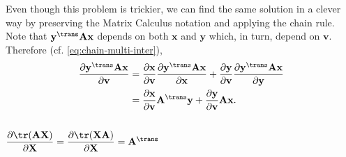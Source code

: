 Even though this problem is trickier, we can find the same solution in a clever way by preserving the Matrix Calculus notation and applying the chain rule. Note that \(\mathbf{y}^\trans \mathbf{A} \mathbf{x}\) depends on both \(\mathbf{x}\) and \(\mathbf{y}\) which, in turn, depend on \(\mathbf{v}\). Therefore (cf. \eqref{eq:chain-multi-inter}),
\begin{align}
    \dfrac{\partial \mathbf{y}^\trans \mathbf{A} \mathbf{x}}{\partial \mathbf{v}} & = \dfrac{\partial \mathbf{x}}{\partial \mathbf{v}} \dfrac{\partial \mathbf{y}^\trans \mathbf{A} \mathbf{x}}{\partial \mathbf{x}} + \dfrac{\partial \mathbf{y}}{\partial \mathbf{v}} \dfrac{\partial \mathbf{y}^\trans \mathbf{A} \mathbf{x}}{\partial \mathbf{y}} \\
    & = \dfrac{\partial \mathbf{x}}{\partial \mathbf{v}} \mathbf{A}^{\trans} \mathbf{y} + \dfrac{\partial \mathbf{y}}{\partial \mathbf{v}} \mathbf{A} \mathbf{x}.
\end{align}

\subsection{\(\dfrac{\partial \tr(\mathbf{A} \mathbf{X})}{\partial \mathbf{X}} = \dfrac{\partial \tr(\mathbf{X} \mathbf{A})}{\partial \mathbf{X}} = \mathbf{A}^\trans\)}


